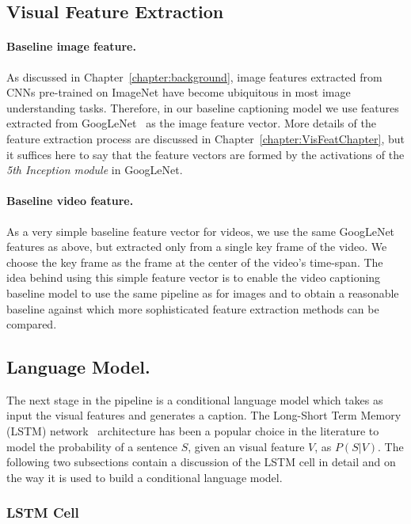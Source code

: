 \subsection{Visual Feature Extraction}

\paragraph{Baseline image feature.} As discussed in
Chapter~\ref{chapter:background}, image features extracted from CNNs pre-trained
on ImageNet have become ubiquitous in most image understanding tasks.
Therefore, in our baseline captioning model we use features extracted from
GoogLeNet~\cite{DBLP:journals/corr/SzegedyLJSRAEVR14} as the image feature
vector.
More details of the feature extraction process are discussed in
Chapter~\ref{chapter:VisFeatChapter}, but it suffices here to say that the feature
vectors are formed by the activations of the \emph{5th Inception module} in
GoogLeNet.

\paragraph{Baseline video feature.} As a very simple baseline feature vector for
videos, we use the same GoogLeNet features as above, but extracted only from a
single key frame of the video.
We choose the key frame as the frame at the center of the video's time-span.
The idea behind using this simple feature vector is to enable the video
captioning baseline model to use the same pipeline as for images and to obtain a
reasonable baseline against which more sophisticated feature extraction methods
can be compared.

\subsection{Language Model.}

The next stage in the pipeline is a conditional language model which
takes as input the visual features and generates a caption.
The Long-Short Term Memory (LSTM) network~\cite{Hochreiter1997} architecture has
been a popular choice in the literature to model the probability of a sentence
$S$, given an visual feature $V$, as $P(S|V)$.
The following two subsections contain a discussion of the LSTM cell in detail
and on the way it is used to build a conditional language model.

\subsubsection{LSTM Cell}

